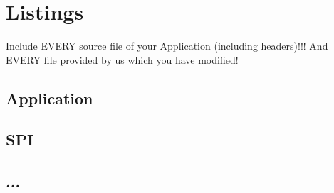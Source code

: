 \section{Listings}
\small{

Include EVERY source file of your Application (including headers)!!!
And EVERY file provided by us which you have modified!

\subsection{Application}
























\subsection{SPI}


\subsection{...}



}%
